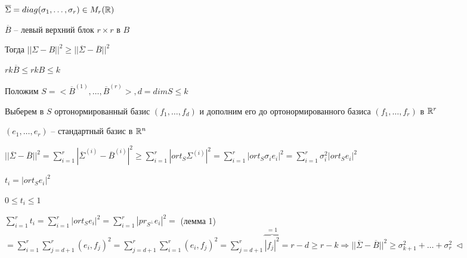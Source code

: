 $\overline{\Sigma} = diag(\sigma_1, \dots, \sigma_r) \in M_r (\mathbb{R})$

$\overline{B}$ -- левый верхний блок $r \times r$ в $B$

\vspace{\baselineskip}
Тогда $||\Sigma - B||^2 \geqslant ||\overline{\Sigma} - \overline{B}||^2$

$rk \overline{B} \leqslant rkB \leqslant k$

\vspace{\baselineskip}
Положим $S = <\overline{B}^{(1)}, \dots, \overline{B}^{(r)}>, d = dimS \leqslant k$

Выберем в $S$ ортонормированный базис $(f_1, \dots, f_d)$ и дополним его до ортонормированного базиса $(f_1, \dots, f_r)$ в $\mathbb{R}^r$

$(e_1, \dots, e_r)$ -- стандартный базис в $\mathbb{R}^n$

\vspace{\baselineskip}
$||\overline{\Sigma} - \overline{B}||^2 = \sum\limits_{i=1}^r |\overline{\Sigma}^{(i)} - \overline{B}^{(i)}|^2 \geqslant \sum\limits_{i=1}^r |ort_S \Sigma^{(i)}|^2 = \sum\limits_{i=1}^r |ort_S \sigma_i e_i|^2 = \sum\limits_{i=1}^r \sigma_i^2 |ort_S e_i|^2$

\vspace{\baselineskip}
$t_i = |ort_S e_i|^2$

$0 \leqslant t_i \leqslant 1$

$\sum\limits_{i=1}^r t_i = \sum\limits_{i=1}^r |ort_S e_i|^2 = \sum\limits_{i=1}^r |pr_{S^{\bot}} e_i|^2 =$ (лемма 1) $ = \sum\limits_{i=1}^r \sum\limits_{j=d + 1}^r (e_i, f_j)^2 = \sum\limits_{j=d + 1}^r \sum\limits_{i=1}^r (e_i, f_j)^2 = \sum\limits_{j=d + 1}^r \overbrace{|f_j|^2}^{=1} = r - d \geqslant r - k \Rightarrow ||\overline{\Sigma} - \overline{B}||^2 \geqslant \sigma_{k+1}^2 + \dots + \sigma_r^2 \ \lhd$

